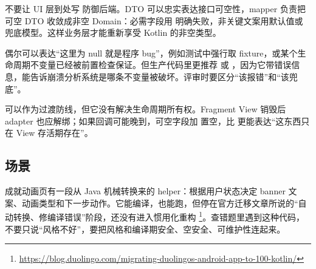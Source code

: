 \begin{idea}[空值应该在系统边界被消灭]
不要让 UI 层到处写  防御后端。DTO 可以忠实表达接口可空性，mapper 负责把可空 DTO 收敛成非空 Domain：必需字段用  明确失败，非关键文案用默认值或兜底模型。这样业务层才能重新享受 Kotlin 的非空类型。
\end{idea}

\begin{pitfall}
\code{!!} 偶尔可以表达“这里为 null 就是程序 bug”，例如测试中强行取 fixture，或某个生命周期不变量已经被前置检查保证。但生产代码里更推荐  或 ，因为它带错误信息，能告诉崩溃分析系统是哪条不变量被破坏。评审时要区分“该报错”和“该兜底”。
\end{pitfall}

\begin{followup}
可以作为过渡防线，但它没有解决生命周期所有权。Fragment View 销毁后 adapter 也应解绑；如果回调可能晚到，可空字段加  置空，比  更能表达“这东西只在 View 存活期存在”。
\end{followup}


\subsection*{场景}
成就动画页有一段从 Java 机械转换来的 helper：根据用户状态决定 banner 文案、动画类型和下一步动作。它能编译，也能跑，但停在官方迁移文章所说的“自动转换、修编译错误”阶段，还没有进入惯用化重构 \srcofficial\footnote{\url{https://blog.duolingo.com/migrating-duolingos-android-app-to-100-kotlin/}}。查错题里遇到这种代码，不要只说“风格不好”，要把风格和编译期安全、空安全、可维护性连起来。

